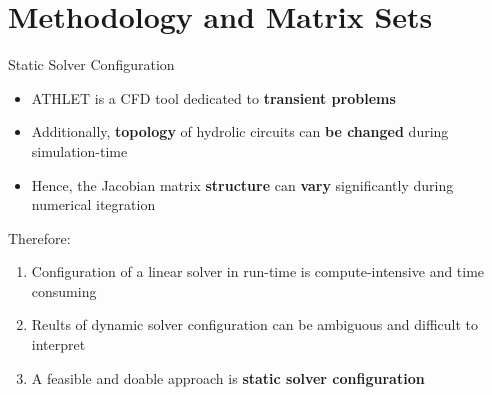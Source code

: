 \section{Methodology and Matrix Sets}


\begin{frame}[t]{Static Solver Configuration}
    \footnotesize
    \justifying
    \begin{itemize}
        \setlength\itemsep{0.25cm}
        \item ATHLET is a CFD tool dedicated to \textbf{transient problems}
        \item Additionally, \textbf{topology} of hydrolic circuits can \textbf{be changed} during simulation-time
        \item Hence, the Jacobian matrix \textbf{structure} can \textbf{vary} significantly during numerical itegration
    \end{itemize}
    
    \small
    \begin{block}{Therefore:}
        \begin{enumerate}
            \item Configuration of a linear solver in run-time is compute-intensive and time consuming
            
            \item Reults of dynamic solver configuration can be ambiguous and difficult to interpret
            
            \item A feasible and doable approach is \textbf{static solver configuration}
        \end{enumerate}
    \end{block}

\end{frame}

